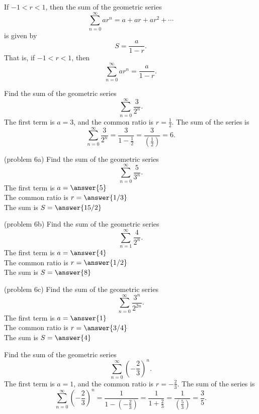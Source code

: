 \documentclass{ximera}
\begin{document}
\begin{theorem}
If $-1 < r < 1$, then the sum of the geometric series 
\[
\sum_{n=0}^\infty ar^n = a + ar + ar^2 + \cdots
\] is given by 
\[
S = \frac{a}{1-r}.
\]
That is, if $-1 < r < 1$, then
\[
\sum_{n=0}^\infty ar^n = \frac{a}{1-r}.
\]
\end{theorem}

\begin{example}[example 6]
Find the sum of the geometric series 
\[
\sum_{n=0}^\infty \frac{3}{2^n}.
\]
The first term is $a = 3$, and the common ratio is $r = \frac12$. The sum of the series is
\[
\sum_{n=0}^\infty \frac{3}{2^n} = \frac{3}{1-\frac12} = \frac{3}{\left(\frac12\right)} = 6.
\]
\end{example}


\begin{problem}(problem 6a)
Find the sum of the geometric series 
\[
\sum_{n=0}^\infty \frac{5}{3^n}.
\]
The first term is $a = \answer{5}$\\
The common ratio is $r = \answer{1/3}$\\
The sum is $S= \answer{15/2}$

\end{problem}

\begin{problem}(problem 6b)
Find the sum of the geometric series 
\[
\sum_{n=1}^\infty \frac{4}{2^n}.
\]
The first term is $a = \answer{4}$\\
The common ratio is $r = \answer{1/2}$\\
The sum is $S= \answer{8}$

\end{problem}

\begin{problem}(problem 6c)
Find the sum of the geometric series 
\[
\sum_{n=0}^\infty \frac{3^n}{2^{2n}}.
\]
The first term is $a = \answer{1}$\\
The common ratio is $r = \answer{3/4}$\\
The sum is $S= \answer{4}$

\end{problem}



\begin{example}[example 7]
Find the sum of the geometric series 
\[
\sum_{n=0}^\infty \left(-\frac23\right)^n.
\]
The first term is $a = 1$, and the common ratio is $r = -\frac23$. The sum of the series is
\[
\sum_{n=0}^\infty \left(-\frac23\right)^n = \frac{1}{1-\left(-\frac23\right)} = \frac{1}{1 + \frac23} = \frac{1}{\left(\frac53\right)} = \frac35.
\]
\end{example}
\end{document}
